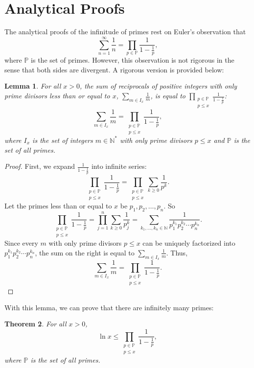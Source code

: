 \documentclass[a4paper]{article}
\newtheorem{theorem}{Theorem}[section]
\newtheorem{lemma}[theorem]{Lemma}
\theoremstyle{definition}
\theoremstyle{remark}
\begin{document}
\section{Analytical Proofs}
\label{sec:analytical}
The analytical proofs of the infinitude of primes rest on Euler's observation that 
\[
\sum^\infty_{n=1}\frac{1}{n}=\prod_{p\in\mathbb{P}}\frac{1}{1-\frac{1}{p}}
,
\]
where $\mathbb{P}$ is the set of primes. However, this observation is not rigorous in the sense that both sides are divergent. A rigorous version is provided below:
\begin{lemma}
  For all $x>0$, the sum of reciprocals of positive integers with only prime divisors less than or equal to $x$, $\displaystyle \sum_{m\in I_x}\frac{1}{m}$, is equal to $\displaystyle \prod\limits_{\substack{p\in\mathbb{P}\\p\le x}}\frac{1}{1-\frac{1}{p}}$:
  \[
  \sum_{m\in I_x}\frac{1}{m}=\prod\limits_{\substack{p\in\mathbb{P}\\p\le x}}\frac{1}{1-\frac{1}{p}}
  ,
  \]
  where $I_x$ is the set of integers $m\in\mathbb{N^*}$ with only prime divisors $p\le x$ and $\mathbb{P}$ is the set of all primes.
  \label{lem:EulerProduct}
\end{lemma}
\begin{proof}
  First, we expand $\frac{1}{1-\frac{1}{p}}$ into infinite series:
  \[
  \prod\limits_{\substack{p\in\mathbb{P}\\p\le x}}\frac{1}{1-\frac{1}{p}}=\prod\limits_{\substack{p\in\mathbb{P}\\p\le x}}\sum_{k\ge0}\frac{1}{p^k}
  .
  \]
  Let the primes less than or equal to $x$ be $p_1,p_2,\dots,p_n$. So
  \[
  \prod\limits_{\substack{p\in\mathbb{P}\\p\le x}}\frac{1}{1-\frac{1}{p}}=\prod\limits_{j=1}^n\sum_{k\ge0}\frac{1}{p_j^k}=\sum\limits_{k_1,\dots,k_n\in\mathbb{N}}\frac{1}{p_1^{k_1}p_2^{k_2}\cdots p_n^{k_n}}
  .
  \]
  Since every $m$ with only prime divisors $p\le x$ can be uniquely factorized into $p_1^{k_1}p_2^{k_2}\cdots p_n^{k_n}$, the sum on the right is equal to $\displaystyle\sum_{m\in I_x}\frac{1}{m}$. Thus,
  \[
  \sum_{m\in I_x}\frac{1}{m}=\prod\limits_{\substack{p\in\mathbb{P}\\p\le x}}\frac{1}{1-\frac{1}{p}}
  .
  \]
\end{proof}
With this lemma, we can prove that there are infinitely many primes:
\begin{theorem}
  For all $x>0$,
  \[
  \ln x\le \prod\limits_{\substack{p\in\mathbb{P}\\p\le x}}\frac{1}{1-\frac{1}{p}}
  ,
  \]
  where $\mathbb{P}$ is the set of all primes. 
  \label{thm:EulerInfinitePrimes}
\end{theorem}
\end{document}
